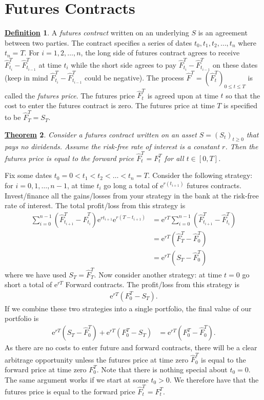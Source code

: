 \documentclass[12pt]{book}
\numberwithin{equation}{chapter}
\theoremstyle{plain}
\newtheorem{theorem}{\underline{Theorem}}
\numberwithin{theorem}{section}
\theoremstyle{definition}
\newtheorem{definition}[theorem]{\underline{Definition}}
\numberwithin{exercise}{chapter}
\let\oldendproof\endproof
\renewenvironment{proof}[1][\proofname]{%
  \oldproof[\scshape\underline{#1}]%
}{\oldendproof}
\newcommand{\<}{\langle}
\renewcommand{\>}{\rangle}
\renewcommand{\(}{\left(}
\renewcommand{\)}{\right)}
\renewcommand{\[}{\left[}
\renewcommand{\]}{\right]}
\newcommand\Fh{\widehat{F}}
\newcommand\ee{\mathrm{e}}
\theoremstyle{definition}
\numberwithin{question}{section}
\begin{document}
\section{Futures Contracts}
\begin{definition}
A \textit{futures contract} written on an underlying $S$ is an agreement between two parties.
The contract specifies a series of dates $t_0, t_1, t_2, \ldots, t_n $ where $t_n = T$.
For $i=1,2,\ldots,n$, the long side of futures contract agrees to receive $\Fh_{t_i}^T - \Fh_{t_{i-1}}^T$ at time $t_i$ while the short side agrees to pay $\Fh_{t_i}^T - \Fh_{t_{i-1}}^T$ on these dates (keep in mind $\Fh_{t_i}^T - \Fh_{t_{i-1}}^T$ could be negative).  The process $\Fh^T = (\Fh_t^T)_{0 \leq t \leq T}$ is called the \textit{futures price}.  The futures price $\Fh_t^T$ is agreed upon at time $t$ so that the cost to enter the futures contract is zero.  The futures price at time $T$ is specified to be $\Fh_T^T = S_T$. 
\end{definition}

\begin{theorem}
Consider a futures contract written on an asset $S = (S_t)_{t \geq 0}$ that pays no dividends.
Assume the risk-free rate of interest is a constant $r$.  Then the futures price is equal to the forward price $\Fh_t^T = F_t^T $ for all $t \in [0,T]$.
\end{theorem}

\begin{proof}
Fix some dates $t_0 = 0 < t_1 < t_2 < \ldots < t_n = T$.  Consider the following strategy: for $i=0,1,\ldots,n-1$, at time $t_i$ go long a total of $\ee^{r(t_{i+1})}$ futures contracts.  Invest/finance all the gains/losses from your strategy in the bank at the risk-free rate of interest.  The total profit/loss from this strategy is
\begin{align}
\sum_{i=0}^{n-1} (\Fh_{t_{i+1}}^T - \Fh_{t_{i}}^T) \ee^{rt_{i+1}}  \ee^{r(T-t_{i+1})}
	&=	\ee^{rT} \sum_{i=0}^{n-1} (\Fh_{t_{i+1}}^T - \Fh_{t_{i}}^T) \\
	&=	\ee^{rT} ( \Fh_T^T - \Fh_0^T ) \\
	&=	\ee^{rT} (S_T - \Fh_0^T) 
\end{align}
where we have used $S_T = \Fh_T^T$.  Now consider another strategy: at time $t=0$ go short a total of $\ee^{rT}$ Forward contracts.  The profit/loss from this strategy is
\begin{align}
\ee^{rT} (F_0^T - S_T) .
\end{align}
If we combine these two strategies into a single portfolio, the final value of our portfolio is
\begin{align}
\ee^{rT} (S_T - \Fh_0^T)  + \ee^{rT} (F_0^T - S_T)  
	&=	\ee^{rT}  ( F_0^T - \Fh_0^T ) .
\end{align}
As there are no costs to enter future and forward contracts, there will be a clear arbitrage opportunity unless the futures price at time zero $\Fh_0^T$ is equal to the forward price at time zero $F_0^T$.
Note that there is nothing special about $t_0=0$.  The same argument works if we start at some $t_0>0$.  
We therefore have that the futures price is equal to the forward price $\Fh_t^T = F_t^T$.
\end{proof}
\end{document}
